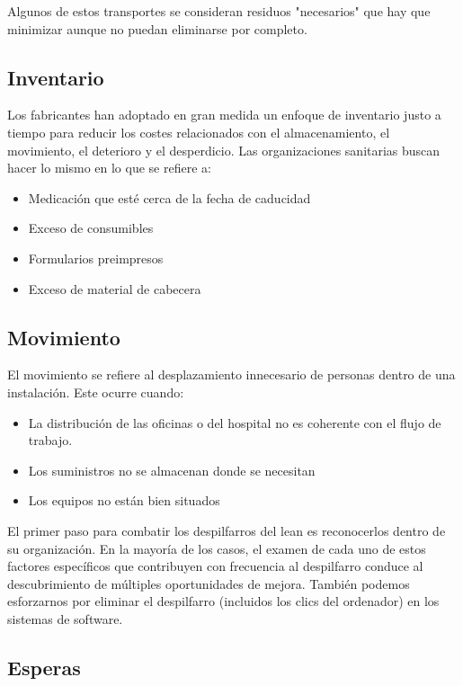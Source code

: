 Algunos de estos transportes se consideran residuos "necesarios" que hay que minimizar aunque no puedan eliminarse por completo.

\subsection{Inventario}

Los fabricantes han adoptado en gran medida un enfoque de inventario justo a tiempo para reducir los costes relacionados con el almacenamiento, el movimiento, el deterioro y el desperdicio.
Las organizaciones sanitarias buscan hacer lo mismo en lo que se refiere a:

\begin{itemize}
    \item Medicación que esté cerca de la fecha de caducidad
    \item Exceso de consumibles
    \item Formularios preimpresos
    \item Exceso de material de cabecera
\end{itemize}

\subsection{Movimiento}

El movimiento se refiere al desplazamiento innecesario de personas dentro de una instalación.
Este ocurre cuando:

\begin{itemize}
    \item La distribución de las oficinas o del hospital no es coherente con el flujo de trabajo.
    \item Los suministros no se almacenan donde se necesitan
    \item Los equipos no están bien situados
\end{itemize}

El primer paso para combatir los despilfarros del lean es reconocerlos dentro de su organización.
En la mayoría de los casos, el examen de cada uno de estos factores específicos que contribuyen con frecuencia al despilfarro conduce al descubrimiento de múltiples oportunidades de mejora.
También podemos esforzarnos por eliminar el despilfarro (incluidos los clics del ordenador) en los sistemas de software.

\subsection{Esperas}

